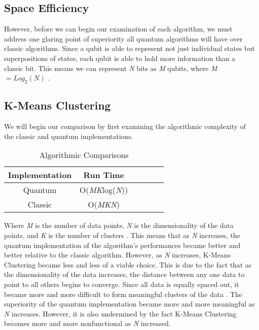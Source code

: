 \documentclass[conference]{IEEEtran}
\begin{document}
\subsection{Space Efficiency}
However, before we can begin our examination of each algorithm, we must address one glaring point of superiority all quantum algorithms will have over classic algorithms. Since a qubit is able to represent not just individual states but superpositions of states, each qubit is able to hold more information than a classic bit. This means we can represent \emph{N} bits as \emph{M} qubits, where \emph{M} $ = Log_2(N)$ \cite{b12}.
\subsection{K-Means Clustering}
We will begin our comparison by first examining the algorithmic complexity of the classic and quantum implementations. 
\begin{table}[H]
\centering
\caption{Algorithmic Comparisons}
\begin{tabular}{|c|c|c|c|c|c|}
\hline
 Implementation & Run Time   \\
\hline
Quantum & O(\emph{MK}log(\emph{N})) \\
\hline
Classic & O(\emph{MKN}) \\
\hline
\end{tabular}
\end{table}
Where \emph{M} is the number of data points, \emph{N} is the dimensionality of the data points, and \emph{K} is the number of clusters \cite{b6}. This means that as \emph{N} increases, the quantum implementation of the algorithm's performances became better and better relative to the classic algorithm. However, as \emph{N} increases, K-Means Clustering became less and less of a viable choice. This is due to the fact that as the dimensionality of the data increases, the distance between any one data to point to all others begins to converge. Since all data is equally spaced out, it became more and more difficult to form meaningful clusters of the data \cite{b15}. The superiority of the quantum implementation became more and more meaningful as \emph{N} increases. However, it is also undermined by the fact K-Means Clustering becomes more and more nonfunctional as \emph{N} increased.  
\end{document}
